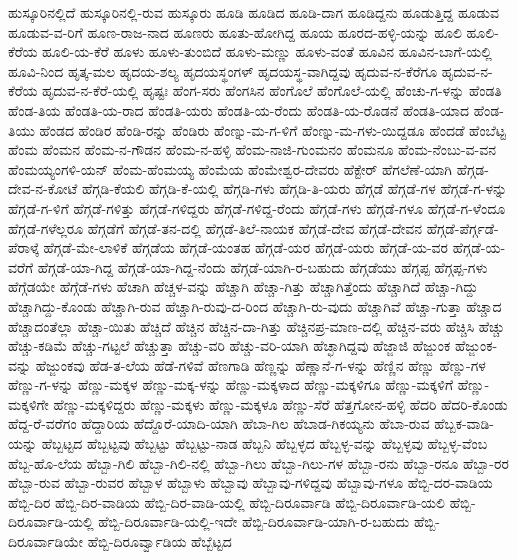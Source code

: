 ಹುಸ್ಕೂರಿನಲ್ಲಿದೆ
ಹುಸ್ಕೂರಿನಲ್ಲಿ-ರುವ
ಹುಸ್ಕೂರು
ಹೂಡಿ
ಹೂಡಿದ
ಹೂಡಿ-ದಾಗ
ಹೂಡಿದ್ದನು
ಹೂಡುತ್ತಿದ್ದ
ಹೂಡುವ
ಹೂಡುವ-ವ-ರಿಗೆ
ಹೂಣ-ರಾಜ-ನಾದ
ಹೂಣರು
ಹೂತು-ಹೋಗಿದ್ದ
ಹೂಯ
ಹೂರದ-ಹಳ್ಳಿ-ಯನ್ನು
ಹೂಲಿ
ಹೂಲಿ-ಕೆರೆಯ
ಹೂಲಿ-ಯ-ಕೆರೆ
ಹೂಳು
ಹೂಳು-ತುಂಬಿದೆ
ಹೂಳು-ಮಣ್ಣು
ಹೂಳು-ವಂತೆ
ಹೂವಿನ
ಹೂವಿನ-ಬಾಗೆ-ಯಲ್ಲಿ
ಹೂವಿ-ನಿಂದ
ಹೃತ್ಕ-ಮಲ
ಹೃದಯ-ಶಲ್ಯ
ಹೃದಯಸ್ಥಂಗಳ್
ಹೃದಯಸ್ಥ-ವಾಗಿದ್ದವು
ಹೃದುವ-ನ-ಕೆರೆಗೂ
ಹೃದುವ-ನ-ಕೆರೆಯ
ಹೃದುವ-ನ-ಕೆರೆ-ಯಲ್ಲಿ
ಹೃಷ್ಟಃ
ಹೆಂಗ-ಸರು
ಹೆಂಗಸಿನ
ಹೆಂಗೊಲೆ
ಹೆಂಗೊಲೆ-ಯಲ್ಲಿ
ಹೆಂಚು-ಗ-ಳನ್ನು
ಹೆಂಡತಿ
ಹೆಂಡ-ತಿಯ
ಹೆಂಡತಿ-ಯ-ರಾದ
ಹೆಂಡತಿ-ಯರು
ಹೆಂಡತಿ-ಯ-ರೆಂದು
ಹೆಂಡತಿ-ಯ-ರೊಡನೆ
ಹೆಂಡತಿ-ಯಾದ
ಹೆಂಡ-ತಿಯು
ಹೆಂಡದ
ಹೆಂಡಿರ
ಹೆಂಡಿ-ರನ್ನು
ಹೆಂಡಿರು
ಹೆಂಣ್ನು-ಮ-ಗ-ಳಿಗೆ
ಹೆಂಣ್ನು-ಮ-ಗಳು-ಯಿದ್ದಡೂ
ಹೆಂದಡೆ
ಹೆಂಬೆಟ್ಟ
ಹೆಂಮ
ಹೆಂಮನ
ಹೆಂಮ-ನ-ಗೌಡನ
ಹೆಂಮ-ನ-ಹಳ್ಳಿ
ಹೆಂಮ-ನಾಜಿ-ಗುಂಮನಂ
ಹೆಂಮನೂ
ಹೆಂಮ-ನೆಂಬು-ವ-ವನ
ಹೆಂಮಯ್ಯಂಗಳಿ-ಯನ್
ಹೆಂಮ-ಹೆಂಮಯ್ಯ
ಹೆಂಮೆಯ
ಹೆಂಮೇಶ್ವರ-ದೇವರು
ಹೆಕ್ಟೇರ್
ಹೆಗಲೆಣೆ-ಯಾಗಿ
ಹೆಗ್ಗಡ-ದೇವ-ನ-ಕೋಟೆ
ಹೆಗ್ಗಡಿ-ಕೆಯಲಿ
ಹೆಗ್ಗಡಿ-ಕೆ-ಯಲ್ಲಿ
ಹೆಗ್ಗಡಿ-ಗಳು
ಹೆಗ್ಗಡಿ-ತಿ-ಯರು
ಹೆಗ್ಗಡೆ
ಹೆಗ್ಗಡೆ-ಗಳ
ಹೆಗ್ಗಡೆ-ಗ-ಳನ್ನು
ಹೆಗ್ಗಡೆ-ಗ-ಳಿಗೆ
ಹೆಗ್ಗಡೆ-ಗಳಿತ್ತು
ಹೆಗ್ಗಡೆ-ಗಳಿದ್ದರು
ಹೆಗ್ಗಡೆ-ಗಳಿದ್ದ-ರೆಂದು
ಹೆಗ್ಗಡೆ-ಗಳು
ಹೆಗ್ಗಡೆ-ಗಳೂ
ಹೆಗ್ಗಡೆ-ಗ-ಳೆಂದೂ
ಹೆಗ್ಗಡೆ-ಗಳೆಲ್ಲರೂ
ಹೆಗ್ಗಡೆಗೆ
ಹೆಗ್ಗಡೆ-ತನ-ದಲ್ಲಿ
ಹೆಗ್ಗಡೆ-ತಿಲೆ-ನಾಯಕ
ಹೆಗ್ಗಡೆ-ದೇವ
ಹೆಗ್ಗಡೆ-ದೇವನ
ಹೆಗ್ಗಡೆ-ಪೆರ್ಗ್ಗಡೆ-ಪೆರಾಳ್ಕೆ
ಹೆಗ್ಗಡೆ-ಮೇ-ಲಾಳಿಕೆ
ಹೆಗ್ಗಡೆಯ
ಹೆಗ್ಗಡೆ-ಯಂತಹ
ಹೆಗ್ಗಡೆ-ಯರ
ಹೆಗ್ಗಡೆ-ಯರು
ಹೆಗ್ಗಡೆ-ಯ-ವರ
ಹೆಗ್ಗಡೆ-ಯ-ವರೆಗೆ
ಹೆಗ್ಗಡೆ-ಯಾ-ಗಿದ್ದ
ಹೆಗ್ಗಡೆ-ಯಾ-ಗಿದ್ದ-ನೆಂದು
ಹೆಗ್ಗಡೆ-ಯಾಗಿ-ರ-ಬಹುದು
ಹೆಗ್ಗಡೆಯು
ಹೆಗ್ಗಪ್ಪ
ಹೆಗ್ಗಪ್ಪ-ಗಳು
ಹೆಗ್ಗೆಡಯೇ
ಹೆಗ್ಗೆಡೆ-ಗಳು
ಹೆಚಾಗಿ
ಹೆಚ್ಚಳ-ವನ್ನು
ಹೆಚ್ಚಾಗಿ
ಹೆಚ್ಚಾ-ಗಿತ್ತು
ಹೆಚ್ಚಾಗಿತ್ತೆಂದು
ಹೆಚ್ಚಾಗಿದೆ
ಹೆಚ್ಚಾ-ಗಿದ್ದು
ಹೆಚ್ಚಾಗಿದ್ದು-ಕೊಂಡು
ಹೆಚ್ಚಾಗಿ-ರುವ
ಹೆಚ್ಚಾಗಿ-ರುವು-ದ-ರಿಂದ
ಹೆಚ್ಚಾಗಿ-ರು-ವುದು
ಹೆಚ್ಚಾಗಿವೆ
ಹೆಚ್ಚಾ-ಗುತ್ತಾ
ಹೆಚ್ಚಾದ
ಹೆಚ್ಚಾದಂತೆಲ್ಲಾ
ಹೆಚ್ಚಾ-ಯಿತು
ಹೆಚ್ಚಿದೆ
ಹೆಚ್ಚಿನ
ಹೆಚ್ಚಿನ-ದಾ-ಗಿತ್ತು
ಹೆಚ್ಚಿನಪ್ರ-ಮಾಣ-ದಲ್ಲಿ
ಹೆಚ್ಚಿನ-ವರು
ಹೆಚ್ಚಿಸಿ
ಹೆಚ್ಚು
ಹೆಚ್ಚು-ಕಡಿಮೆ
ಹೆಚ್ಚು-ಗಟ್ಟಲೆ
ಹೆಚ್ಚುತ್ತಾ
ಹೆಚ್ಚು-ವರಿ
ಹೆಚ್ಚು-ವರಿ-ಯಾಗಿ
ಹೆಚ್ಛಾಗಿದ್ದವು
ಹೆಜ್ಜಾಜಿ
ಹೆಜ್ಜುಂಕ
ಹೆಜ್ಜುಂಕ-ವನ್ನು
ಹೆಜ್ಜುಂಕವು
ಹೆಡ-ತ-ಲೆಯ
ಹೆಡೆ-ಗಳಿವೆ
ಹೆಣಗಾಡಿ
ಹೆಣ್ಣನ್ನು
ಹೆಣ್ಣಾನೆ-ಗ-ಳನ್ನು
ಹೆಣ್ಣಿನ
ಹೆಣ್ಣು
ಹೆಣ್ಣು-ಗಳ
ಹೆಣ್ಣು-ಗ-ಳನ್ನು
ಹೆಣ್ಣು-ಮಕ್ಕಳ
ಹೆಣ್ಣು-ಮಕ್ಕ-ಳನ್ನು
ಹೆಣ್ಣು-ಮಕ್ಕಳಾದ
ಹೆಣ್ಣು-ಮಕ್ಕಳಿಗೂ
ಹೆಣ್ಣು-ಮಕ್ಕಳಿಗೆ
ಹೆಣ್ಣು-ಮಕ್ಕಳಿಗೇ
ಹೆಣ್ಣು-ಮಕ್ಕಳಿದ್ದರು
ಹೆಣ್ಣು-ಮಕ್ಕಳು
ಹೆಣ್ಣು-ಮಕ್ಕಳೂ
ಹೆಣ್ಣು-ಸೆರೆ
ಹೆತ್ತಗೋನ-ಹಳ್ಳಿ
ಹೆದರಿ
ಹೆದರಿ-ಕೊಂಡು
ಹೆದ್ದ-ರೆ-ವರೆಗಂ
ಹೆದ್ದಾರಿಯ
ಹೆದ್ದೊರೆ-ಯಾದಿ-ಯಾಗಿ
ಹೆಬಾ-ಗಿಲ
ಹೆಬಾಡ-ಗಿಕಯ್ಯನು
ಹೆಬಾ-ರುವ
ಹೆಬ್ಬಕ-ವಾಡಿ-ಯನ್ನು
ಹೆಬ್ಬಟ್ಟದ
ಹೆಬ್ಬಟ್ಟವು
ಹೆಬ್ಬಟ್ಟು
ಹೆಬ್ಬಟ್ಟು-ನಾಡ
ಹೆಬ್ಬನಿ
ಹೆಬ್ಬಳ್ಳದ
ಹೆಬ್ಬಳ್ಳ-ವನ್ನು
ಹೆಬ್ಬಳ್ಳವು
ಹೆಬ್ಬಳ್ಳ-ವೆಂಬ
ಹೆಬ್ಬ-ಹೊ-ಲೆಯ
ಹೆಬ್ಬಾ-ಗಿಲಿ
ಹೆಬ್ಬಾ-ಗಿಲಿ-ನಲ್ಲಿ
ಹೆಬ್ಬಾ-ಗಿಲು
ಹೆಬ್ಬಾ-ಗಿಲು-ಗಳ
ಹೆಬ್ಬಾ-ರನು
ಹೆಬ್ಬಾ-ರನೂ
ಹೆಬ್ಬಾ-ರರ
ಹೆಬ್ಬಾ-ರುವ
ಹೆಬ್ಬಾ-ರುವರ
ಹೆಬ್ಬಾಳ
ಹೆಬ್ಬಾಳು
ಹೆಬ್ಬಾವು
ಹೆಬ್ಬಾವು-ಗಳಿದ್ದವು
ಹೆಬ್ಬಾವು-ಗಳೂ
ಹೆಬ್ಬಿ-ದರ-ವಾಡಿಯ
ಹೆಬ್ಬಿ-ದಿರ
ಹೆಬ್ಬಿ-ದಿರ-ವಾಡಿಯ
ಹೆಬ್ಬಿ-ದಿರ-ವಾಡಿ-ಯಲ್ಲಿ
ಹೆಬ್ಬಿ-ದಿರೂರ್ವಾಡಿ
ಹೆಬ್ಬಿ-ದಿರೂರ್ವಾಡಿ-ಯಲಿ
ಹೆಬ್ಬಿ-ದಿರೂರ್ವಾಡಿ-ಯಲ್ಲಿ
ಹೆಬ್ಬಿ-ದಿರೂರ್ವಾಡಿ-ಯಲ್ಲಿ-ಇದೇ
ಹೆಬ್ಬಿ-ದಿರೂರ್ವಾಡಿ-ಯಾಗಿ-ರ-ಬಹುದು
ಹೆಬ್ಬಿ-ದಿರೂರ್ವಾಡಿಯೇ
ಹೆಬ್ಬಿ-ದಿರೂರ್ವ್ವಾಡಿಯ
ಹೆಬ್ಬೆಟ್ಟದ
